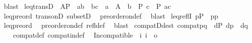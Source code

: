 \begin{isabellebody}
\ blast%
\endisatagproof
{\isafoldproof}%
%
\isadelimproof
\isanewline
%
\endisadelimproof
\isanewline
{}\isamarkupfalse%
\ leq{\isacharunderscore}{\kern0pt}transD{\isacharprime}{\kern0pt}{\isacharcolon}{\kern0pt}\ \ {\isachardoublequoteopen}A{\isasymsubseteq}P\ {\isasymLongrightarrow}\ a{\isasympreceq}b\ {\isasymLongrightarrow}\ b{\isasympreceq}c\ {\isasymLongrightarrow}\ a\ {\isasymin}\ A\ {\isasymLongrightarrow}\ b\ {\isasymin}\ P{\isasymLongrightarrow}\ c\ {\isasymin}\ P{\isasymLongrightarrow}\ a{\isasympreceq}c{\isachardoublequoteclose}\isanewline
%
\isadelimproof
\ \ %
\endisadelimproof
%
\isatagproof
{}\isamarkupfalse%
\ leq{\isacharunderscore}{\kern0pt}preord\ trans{\isacharunderscore}{\kern0pt}onD\ subsetD\ \isamarkupfalse%
\ preorder{\isacharunderscore}{\kern0pt}on{\isacharunderscore}{\kern0pt}def\ \isamarkupfalse%
\ blast%
\endisatagproof
{\isafoldproof}%
%
\isadelimproof
\isanewline
%
\endisadelimproof
\isanewline
\isanewline
{}\isamarkupfalse%
\ leq{\isacharunderscore}{\kern0pt}reflI{\isacharcolon}{\kern0pt}\ {\isachardoublequoteopen}p{\isasymin}P\ {\isasymLongrightarrow}\ p{\isasympreceq}p{\isachardoublequoteclose}\isanewline
%
\isadelimproof
\ \ %
\endisadelimproof
%
\isatagproof
{}\isamarkupfalse%
\ leq{\isacharunderscore}{\kern0pt}preord\ \isamarkupfalse%
\ preorder{\isacharunderscore}{\kern0pt}on{\isacharunderscore}{\kern0pt}def\ refl{\isacharunderscore}{\kern0pt}def\ \isamarkupfalse%
\ blast%
\endisatagproof
{\isafoldproof}%
%
\isadelimproof
\isanewline
%
\endisadelimproof
\isanewline
{}\isamarkupfalse%
\ compatD{\isacharbrackleft}{\kern0pt}dest{\isacharbang}{\kern0pt}{\isacharbrackright}{\kern0pt}{\isacharcolon}{\kern0pt}\ {\isachardoublequoteopen}compat{\isacharparenleft}{\kern0pt}p{\isacharcomma}{\kern0pt}q{\isacharparenright}{\kern0pt}\ {\isasymLongrightarrow}\ {\isasymexists}d{\isasymin}P{\isachardot}{\kern0pt}\ d{\isasympreceq}p\ {\isasymand}\ d{\isasympreceq}q{\isachardoublequoteclose}\isanewline
%
\isadelimproof
\ \ %
\endisadelimproof
%
\isatagproof
{}\isamarkupfalse%
\ compat{\isacharunderscore}{\kern0pt}def\ compat{\isacharunderscore}{\kern0pt}in{\isacharunderscore}{\kern0pt}def\ \isacommand{{\isachardot}{\kern0pt}}\isamarkupfalse%
%
\endisatagproof
{\isafoldproof}%
%
\isadelimproof
\isanewline
%
\endisadelimproof
\isanewline
{}\isamarkupfalse%
\ Incompatible\ {\isacharcolon}{\kern0pt}{\isacharcolon}{\kern0pt}\ {\isachardoublequoteopen}{\isacharbrackleft}{\kern0pt}i{\isacharcomma}{\kern0pt}\ i{\isacharbrackright}{\kern0pt}\ {\isasymRightarrow}\ o{\isachardoublequoteclose}\ \ {\isacharparenleft}{\kern0pt}\ {\isachardoublequoteopen}{\isasymbottom}{\isachardoublequoteclose}\ {}{}{\isacharparenright}{\kern0pt}\isanewline

\end{isabellebody}
